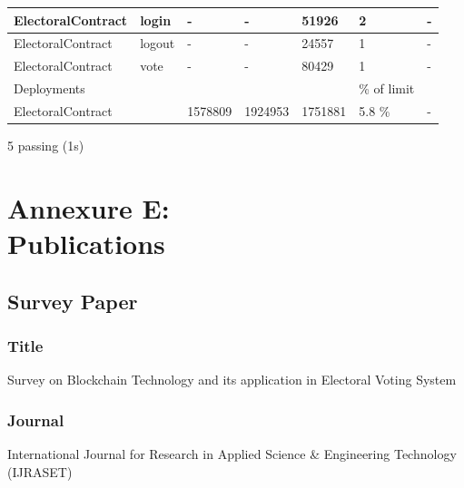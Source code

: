 \documentclass[oneside, 12pt]{book}
\begin{document}
{\begin{minipage}{\linewidth}
\begin{table}[H]
{\begin{tabular}{|ll|lllll|}
					\multicolumn{1}{|l|}{ElectoralContract}    & login                                         & \multicolumn{1}{l|}{-}           & \multicolumn{1}{l|}{-}                         & \multicolumn{1}{l|}{51926}  & \multicolumn{1}{l|}{2}                 & -                  \\ \hline
					\multicolumn{1}{|l|}{ElectoralContract}    & logout                                        & \multicolumn{1}{l|}{-}           & \multicolumn{1}{l|}{-}                         & \multicolumn{1}{l|}{24557}  & \multicolumn{1}{l|}{1}                 & -                  \\ \hline
					\multicolumn{1}{|l|}{ElectoralContract}    & vote                                          & \multicolumn{1}{l|}{-}           & \multicolumn{1}{l|}{-}                         & \multicolumn{1}{l|}{80429}  & \multicolumn{1}{l|}{1}                 & -                  \\ \hline
					\multicolumn{2}{|l|}{Deployments}          & \multicolumn{3}{l|}{}                         & \multicolumn{1}{l|}{\% of limit} &                                                                                                                                            \\ \hline
					\multicolumn{2}{|l|}{ElectoralContract}    & \multicolumn{1}{l|}{1578809}                  & \multicolumn{1}{l|}{1924953}     & \multicolumn{1}{l|}{1751881}                   & \multicolumn{1}{l|}{5.8 \%} & -                                                           \\ \hline
				\end{tabular}%
			}
		\end{table}
		5 passing (1s)
		\vspace*{2pt}
	\end{minipage}%
}
\newpage
\section{Annexure E:\\Publications}
\newpage
\subsection{Survey Paper}
\subsubsection{Title}
Survey on Blockchain Technology and its application in Electoral Voting System
\subsubsection{Journal}
International Journal for Research in Applied Science \& Engineering Technology (IJRASET)
\end{document}
